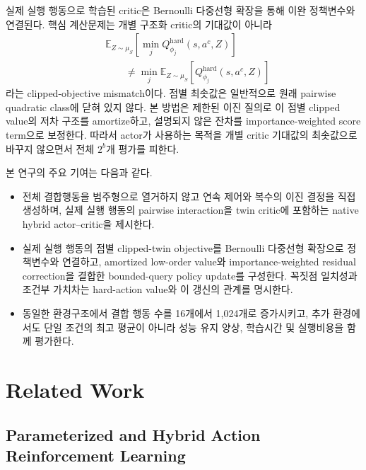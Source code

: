 \documentclass[10pt,journal]{IEEEtran}
\newcommand{\E}{\mathbb{E}}
\begin{document}
실제 실행 행동으로 학습된 critic은 Bernoulli 다중선형 확장을 통해 이완 정책변수와 연결된다. 핵심 계산문제는 개별 구조화 critic의 기대값이 아니라
\begin{equation}
\begin{aligned}
&\E_{Z\sim\mu_S}\!\left[\min_j Q_{\phi_j}^{\mathrm{hard}}(s,a^c,Z)\right]\\
&\qquad\neq
\min_j\E_{Z\sim\mu_S}\!\left[Q_{\phi_j}^{\mathrm{hard}}(s,a^c,Z)\right]
\end{aligned}
\label{eq:intro-clipped-gap}
\end{equation}
라는 clipped-objective mismatch이다. 점별 최솟값은 일반적으로 원래 pairwise quadratic class에 닫혀 있지 않다. 본 방법은 제한된 이진 질의로 이 점별 clipped value의 저차 구조를 amortize하고, 설명되지 않은 잔차를 importance-weighted score term으로 보정한다. 따라서 actor가 사용하는 목적을 개별 critic 기대값의 최솟값으로 바꾸지 않으면서 전체 $2^b$개 평가를 피한다.

본 연구의 주요 기여는 다음과 같다.

\begin{itemize}
    \item 전체 결합행동을 범주형으로 열거하지 않고 연속 제어와 복수의 이진 결정을 직접 생성하며, 실제 실행 행동의 pairwise interaction을 twin critic에 포함하는 native hybrid actor--critic을 제시한다.

    \item 실제 실행 행동의 점별 clipped-twin objective를 Bernoulli 다중선형 확장으로 정책변수와 연결하고, amortized low-order value와 importance-weighted residual correction을 결합한 bounded-query policy update를 구성한다. 꼭짓점 일치성과 조건부 가치차는 hard-action value와 이 갱신의 관계를 명시한다.

    \item 동일한 환경구조에서 결합 행동 수를 16개에서 1,024개로 증가시키고, 추가 환경에서도 단일 조건의 최고 평균이 아니라 성능 유지 양상, 학습시간 및 실행비용을 함께 평가한다.
\end{itemize}


\section{Related Work}
\label{sec:related-work}

\subsection{Parameterized and Hybrid Action Reinforcement Learning}
\end{document}
